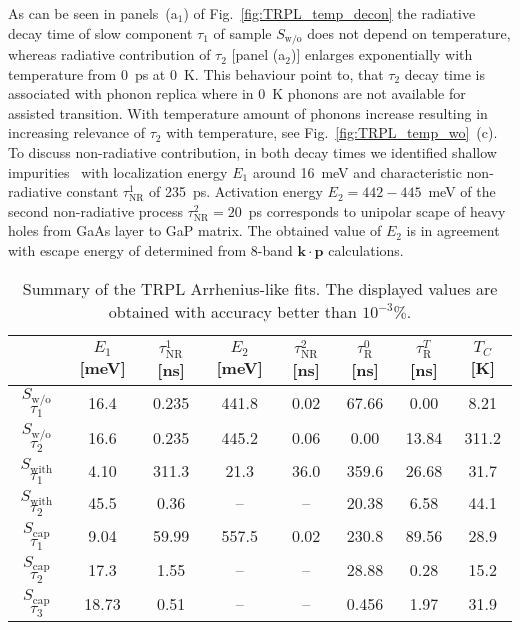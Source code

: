 As can be seen in panels~(a$_1$) of Fig.~\ref{fig:TRPL_temp_decon} the radiative decay time of slow component $\tau_1$ of sample $S_\mathrm{w/o}$ does not depend on temperature, whereas radiative contribution of $\tau_2$ [panel (a$_2$)] enlarges exponentially with temperature from 0~ps at 0~K. This behaviour point to, that $\tau_2$ decay time is associated with phonon replica where in 0~K phonons are not available for assisted transition. With temperature amount of phonons increase resulting in increasing relevance of $\tau_2$ with temperature, see Fig.~\ref{fig:TRPL_temp_wo}~(c). To discuss non-radiative contribution, in both decay times we identified shallow impurities~\citep{Cardona} with localization energy $E_1$ around 16~meV and characteristic non-radiative constant $\tau^1_\mathrm{NR}$ of 235~ps. Activation energy $E_2=442-445$~meV of the second non-radiative process $\tau^2_\mathrm{NR}=20$~ps corresponds to unipolar scape of heavy holes from GaAs layer to GaP matrix. The obtained value of $E_2$ is in agreement with escape energy of {\color{green}{VALUE ještě jednou změřit v pythonu unikovou energii HH pro 5ML vrstvu}} determined from 8-band $\mathbf{k\cdot p}$ calculations.

\begin{table}
	\centering
	\caption{Summary of the TRPL Arrhenius-like fits. The displayed values are obtained with accuracy better than $10^{-3}\%$.}
	\begin{tabularx}{0.95\textwidth}{cCCccccc}
		\toprule
		
		& $E_1$ [meV]& $\tau_\mathrm{NR}^1$ [ns]& $E_2$ [meV]& $\tau_\mathrm{NR}^2$ [ns] & $\tau_\mathrm{R}^0$ [ns]& $\tau_\mathrm{R}^T$ [ns]& $T_C$ [K]\\ 	
		\midrule
		\midrule
		$S_\mathrm{w/o}$ $\tau_1$& 16.4&0.235&441.8 & 0.02& 67.66&0.00&8.21\\
		$S_\mathrm{w/o}$ $\tau_2$& 16.6&0.235&445.2 & 0.06& 0.00&13.84&311.2\\
		\midrule
		
		$S_\mathrm{with}$ $\tau_1$&4.10 & 311.3& 21.3&36.0& 359.6&26.68&31.7\\
		$S_\mathrm{with}$ $\tau_2$&45.5 & 0.36& --&--& 20.38&6.58&44.1\\
		\midrule
		
		$S_\mathrm{cap}$ $\tau_1$& 9.04&59.99&557.5 & 0.02& 230.8&89.56&28.9\\ %
		$S_\mathrm{cap}$ $\tau_2$& 17.3&1.55&-- & --& 28.88&0.28&15.2\\ %
		$S_\mathrm{cap}$ $\tau_3$& 18.73&0.51&-- & --& 0.456&1.97&31.9\\
		
		\bottomrule
	\end{tabularx}\label{tab:TRPL_params}
\end{table}


